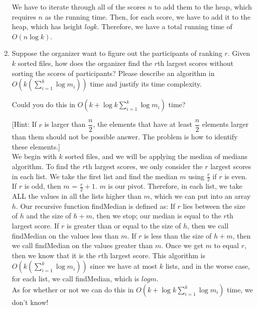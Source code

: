 \documentclass{article}
\begin{document}
\begin{enumerate}
We have to iterate through all of the scores $n$ to add them to the heap, which requires $n$ as the running time. Then, for each score, we have to add it to the heap, which has height $log k$. Therefore, we have a total running time of $O(n\log k)$.

\item Suppose the organizer want to figure out the participants of
  ranking $r$. Given $k$ sorted files, how does the organizer find the
  $r$th largest scores without sorting the scores of participants? Please 
  describe an algorithm in $O(k(\sum_{i=1}^{k}\log m_{i}))$ time and justify
  its time complexity. 

Could you do this in $O(k+\log k \sum_{i=1}^{k}\log m_{i})$ time? 

  [Hint: If $r$ is larger than $\dfrac{n}{2}$, the elements that have at least $\dfrac{n}{2}$ 
  elements larger than them should not be possible answer. The problem is how to identify these
  elements.]\\

We begin with $k$ sorted files, and we will be applying the median of medians algorithm. To find the $r$th largest scores, we only consider the $r$ largest scores in each list. We take the first list and find the median $m$ using $\frac{r}{2}$ if $r$ is even. If $r$ is odd, then $m$ = $\frac{r}{2} + 1$. $m$ is our pivot. Therefore, in each list, we take ALL the values in all the lists higher than $m$, which we can put into an array $h$. Our recursive function findMedian is defined as: If $r$ lies between the size of $h$ and the size of $h + m$, then we stop; our median is equal to the $r$th largest score. If $r$ is greater than or equal to the size of $h$, then we call findMedian on the values less than $m$. If $r$ is less than the size of $h + m$, then we call findMedian on the values greater than $m$. Once we get $m$ to equal $r$, then we know that it is the $r$th largest score. This algorithm is $O(k(\sum_{i=1}^{k}\log m_{i}))$ since we have at most $k$ lists, and in the worse case, for each list, we call findMedian, which is $log m$. \\

As for whether or not we can do this in $O(k+\log k \sum_{i=1}^{k}\log m_{i})$ time, we don't know! \\

\end{enumerate}
\end{document}
